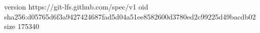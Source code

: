 version https://git-lfs.github.com/spec/v1
oid sha256:d05765d6f3a9427424687fad5d04a51ee8582600d3780ed2c99225d49bacdb02
size 175340
